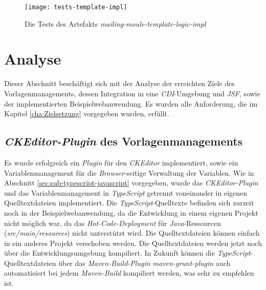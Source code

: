 \begin{figure}[h]
\centering
\texttt{[image: tests-template-impl]}
\caption{Die Tests des Artefakts \emph{mailing-moule-template-logic-impl}}
\label{fig:tests-template-impl}
\end{figure}

\section{Analyse}
Dieser Abschnitt beschäftigt sich mit der Analyse der erreichten Ziele des Vorlagenmanagements, dessen Integration in eine \emph{CDI}-Umgebung und \emph{JSF}, sowie der implementierten Beispielwebanwendung. Es wurden alle Anforderung, die im Kapitel \ref{cha:Zielsetzung} vorgegeben wurden, erfüllt.

\subsection{\emph{CKEditor-Plugin} des Vorlagenmanagements}
Es wurde erfolgreich ein \emph{Plugin} für den \emph{CKEditor} implementiert, sowie ein Variablenmanagement für die \emph{Browser}-seitige Verwaltung der Variablen. Wie in Abschnitt \ref{sec:sub-typescript-javascript} vorgegeben, wurde das \emph{CKEditor-Plugin} und das Variablenmanagement in \emph{TypeScript} getrennt voneinander in eigenen Quelltextdateien implementiert. Die \emph{TypeScript}-Quelltexte befinden sich zurzeit noch in der Beispielwebanwendung, da die Entwicklung in einem eigenen Projekt nicht möglich war, da das \emph{Hot-Code-Deployment} für \emph{Java}-Ressourcen (\emph{src/main/resources}) nicht unterstützt wird. Die Quelltextdateien können einfach in ein anderes Projekt verschoben werden. Die Quelltextdateien werden jetzt noch über die Entwicklungsumgebung kompiliert. In Zukunft können die \emph{TypeScript}-Quelltextdateien über das \emph{Maven-Build-Plugin maven-grunt-plugin} auch automatisiert bei jedem \emph{Maven-Build} kompiliert werden, was sehr zu empfehlen ist.

